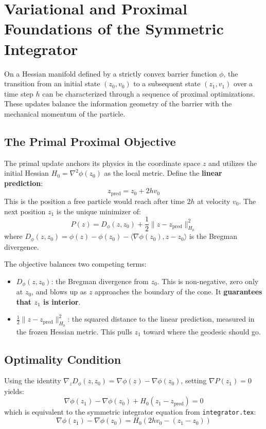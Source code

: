 \section{Variational and Proximal Foundations of the Symmetric Integrator}

On a Hessian manifold defined by a strictly convex barrier function $\phi$, the transition from an initial state $(z_0, v_0)$ to a subsequent state $(z_1, v_1)$ over a time step $h$ can be characterized through a sequence of proximal optimizations. These updates balance the information geometry of the barrier with the mechanical momentum of the particle.

\subsection{The Primal Proximal Objective}
The primal update anchors its physics in the coordinate space $z$ and utilizes the initial Hessian $H_0 = \nabla^2 \phi(z_0)$ as the local metric. Define the \textbf{linear prediction}:
\begin{equation}
z_{\mathrm{pred}} = z_0 + 2h v_0
\end{equation}
This is the position a free particle would reach after time $2h$ at velocity $v_0$. The next position $z_1$ is the unique minimizer of:
\begin{equation}
\label{eq:primal_objective}
P(z) = D_\phi(z, z_0) + \frac{1}{2}\|z - z_{\mathrm{pred}}\|_{H_0}^2
\end{equation}
where $D_\phi(z, z_0) = \phi(z) - \phi(z_0) - \langle \nabla \phi(z_0), z - z_0 \rangle$ is the Bregman divergence.

The objective balances two competing terms:
\begin{itemize}
    \item $D_\phi(z, z_0)$: the Bregman divergence from $z_0$. This is non-negative, zero only at $z_0$, and blows up as $z$ approaches the boundary of the cone. It \textbf{guarantees that $z_1$ is interior}.
    \item $\frac{1}{2}\|z - z_{\mathrm{pred}}\|_{H_0}^2$: the squared distance to the linear prediction, measured in the frozen Hessian metric. This pulls $z_1$ toward where the geodesic should go.
\end{itemize}

\subsection{Optimality Condition}
Using the identity $\nabla_z D_\phi(z, z_0) = \nabla \phi(z) - \nabla \phi(z_0)$, setting $\nabla P(z_1) = 0$ yields:
\begin{equation}
\label{eq:primal_update}
\nabla \phi(z_1) - \nabla \phi(z_0) + H_0(z_1 - z_{\mathrm{pred}}) = 0
\end{equation}
which is equivalent to the symmetric integrator equation from \texttt{integrator.tex}:
\begin{equation}
\nabla \phi(z_1) - \nabla \phi(z_0) = H_0(2hv_0 - (z_1 - z_0))
\end{equation}

